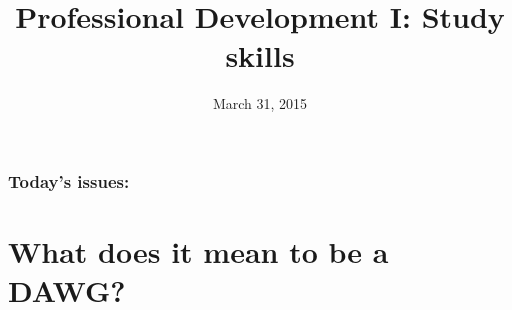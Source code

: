 


% 



\title[Professional Development I]{Professional Development I: Study skills}
\date{March 31, 2015}



\begin{noheadline}
\maketitle
\end{noheadline}


\begin{noheadline}
\begin{frame}
\frametitle{Today's issues:}
\tableofcontents[subsectionstyle=hide]
\end{frame}
\end{noheadline}

\section{What does it mean to be a DAWG?}

